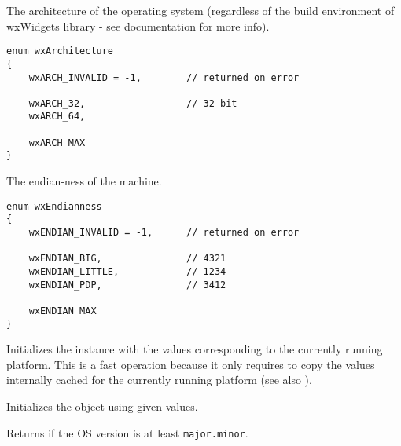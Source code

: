 The architecture of the operating system (regardless of the build environment
of wxWidgets library - see  documentation
for more info).

\begin{verbatim}
enum wxArchitecture
{
    wxARCH_INVALID = -1,        // returned on error

    wxARCH_32,                  // 32 bit
    wxARCH_64,

    wxARCH_MAX
}
\end{verbatim}

The endian-ness of the machine.

\begin{verbatim}
enum wxEndianness
{
    wxENDIAN_INVALID = -1,      // returned on error

    wxENDIAN_BIG,               // 4321
    wxENDIAN_LITTLE,            // 1234
    wxENDIAN_PDP,               // 3412

    wxENDIAN_MAX
}
\end{verbatim}



\label{wxplatforminfowxplatforminfo}


Initializes the instance with the values corresponding to the currently running platform.
This is a fast operation because it only requires to copy the values internally cached for the
currently running platform (see also ).


Initializes the object using given values.



\label{wxplatforminfocheckosversion}


Returns \true if the OS version is at least \texttt{major.minor}.


